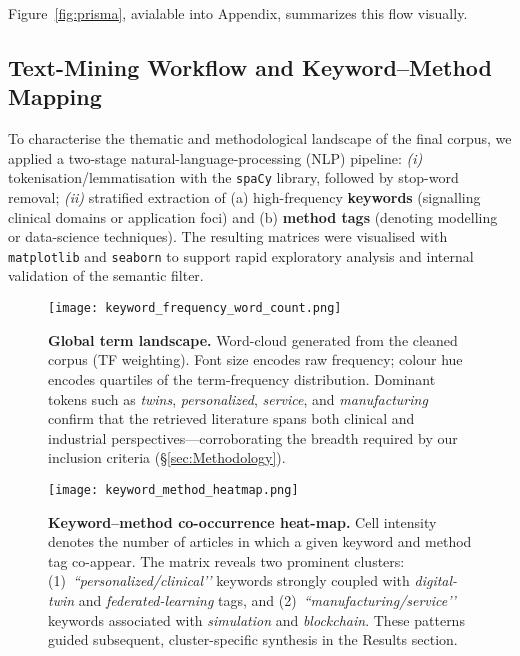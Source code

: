 \documentclass[10pt,a4paper]{article}
\begin{document}
\noindent Figure~\ref{fig:prisma}, avialable into Appendix, summarizes this flow visually.

\vspace{1em}

\subsection*{Text-Mining Workflow and Keyword–Method Mapping}

To characterise the thematic and methodological landscape of the
final corpus, we applied a two-stage natural-language-processing
(NLP) pipeline:  
\emph{(i)} tokenisation\slash lemmatisation with the \texttt{spaCy}
library, followed by stop-word removal;  
\emph{(ii)} stratified extraction of (a) high-frequency \textbf{keywords}
(signalling clinical domains or application foci) and (b)
\textbf{method tags} (denoting modelling or data-science techniques).
The resulting matrices were visualised with \texttt{matplotlib} and
\texttt{seaborn} to support rapid exploratory analysis and internal
validation of the semantic filter.

\begin{figure}[H]
    \centering
    \texttt{[image: keyword\_frequency\_word\_count.png]}
    \caption{%
        \textbf{Global term landscape.}  
        Word-cloud generated from the cleaned corpus (TF weighting).
        Font size encodes raw frequency; colour hue encodes quartiles
        of the term-frequency distribution.
        Dominant tokens such as \emph{twins}, \emph{personalized},
        \emph{service}, and \emph{manufacturing} confirm that the
        retrieved literature spans both clinical and industrial
        perspectives—corroborating the breadth required by our
        inclusion criteria (\S\ref{sec:Methodology}).}
    \label{fig:wordcloud}
\end{figure}

\begin{figure}[H]
    \centering
    \texttt{[image: keyword\_method\_heatmap.png]}
    \caption{%
        \textbf{Keyword–method co-occurrence heat-map.}  
        Cell intensity denotes the number of articles in which a given
        keyword and method tag co-appear.  The matrix reveals two
        prominent clusters:  
        (1)~\emph{“personalized/clinical’’} keywords strongly coupled
        with \emph{digital-twin} and \emph{federated-learning} tags,
        and  
        (2)~\emph{“manufacturing/service’’} keywords associated with
        \emph{simulation} and \emph{blockchain}.  
        These patterns guided subsequent, cluster-specific synthesis
        in the Results section.}
    \label{fig:heatmap}
\end{figure}
\end{document}
